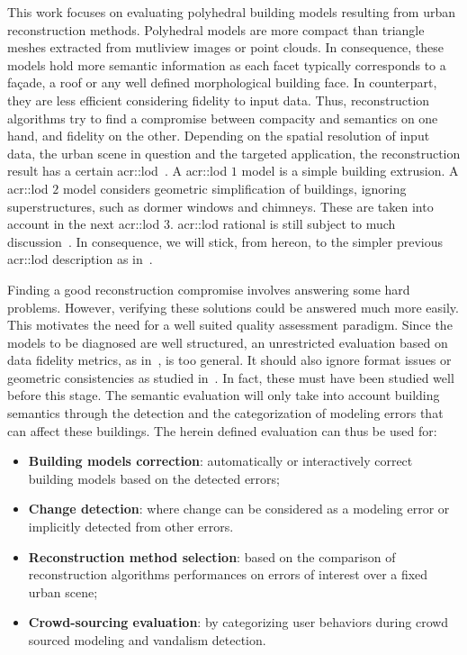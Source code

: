 \documentclass[runningheads]{llncs}
\begin{document}
    This work focuses on evaluating polyhedral building models resulting from urban reconstruction methods. Polyhedral models are more compact than triangle meshes extracted from mutliview images or point clouds. In consequence, these models hold more semantic information as each facet typically corresponds to a fa\c{c}ade, a roof or any well defined morphological building face. In counterpart, they are less efficient considering fidelity to input data. Thus, reconstruction algorithms try to find a compromise between compacity and semantics on one hand, and fidelity on the other. Depending on the spatial resolution of input data, the urban scene in question and the targeted application, the reconstruction result has a certain \gls{acr::lod}~\cite{kolbe2005citygml}. A \acrshort{acr::lod} $1$ model is a simple building extrusion. A \acrshort{acr::lod} $2$ model considers geometric simplification of buildings, ignoring superstructures, such as dormer windows and chimneys. These are taken into account in the next \acrshort{acr::lod} $3$. \acrshort{acr::lod} rational is still subject to much discussion~\cite{2016_ceus_improved_lod}. In consequence, we will stick, from hereon, to the simpler previous \acrshort{acr::lod} description as in~\cite{verdie2015lod}.

     Finding a good reconstruction compromise involves answering some hard problems. However, verifying these solutions could be answered much more easily. This motivates the need for a well suited quality assessment paradigm. Since the models to be diagnosed are well structured, an unrestricted evaluation based on data fidelity metrics, as in~\cite{berger2013benchmark}, is too general. It should also ignore format issues or geometric consistencies as studied in~\cite{ledoux2018val3dity}. In fact, these must have been studied well before this stage. The semantic evaluation will only take into account building semantics through the detection and the categorization of modeling errors that can affect these buildings. The herein defined evaluation can thus be used for:
    \begin{itemize}
        \item \textbf{Building models correction}: automatically or interactively correct building models based on the detected errors;
        \item \textbf{Change detection}: where change can be considered as a modeling error or implicitly detected from other errors.
        \item \textbf{Reconstruction method selection}: based on the comparison of reconstruction algorithms performances on errors of interest over a fixed urban scene;
        \item \textbf{Crowd-sourcing evaluation}: by categorizing user behaviors during crowd sourced modeling and vandalism detection.
    \end{itemize}
\end{document}
